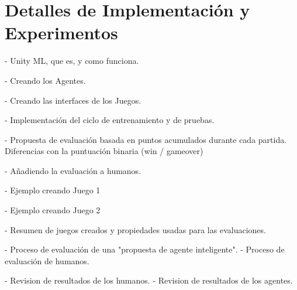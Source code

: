 \chapter{Detalles de Implementación y Experimentos}\label{chapter:implementation}


- Unity ML, que es, y como funciona.

- Creando los Agentes.

- Creando las interfaces de los Juegos.

- Implementación del ciclo de entrenamiento y de pruebas.

- Propuesta de evaluación basada en puntos acumulados durante cada partida. Diferencias con la puntuación binaria (win / gameover)

- Añadiendo la evaluación a humanos.

- Ejemplo creando Juego 1

- Ejemplo creando Juego 2

- Resumen de juegos creados y propiedades usadas para las evaluaciones.

- Proceso de evaluación de una "propuesta de agente inteligente".
- Proceso de evaluación de humanos.
 
- Revision de resultados de los humanos.
- Revision de resultados de los agentes.
